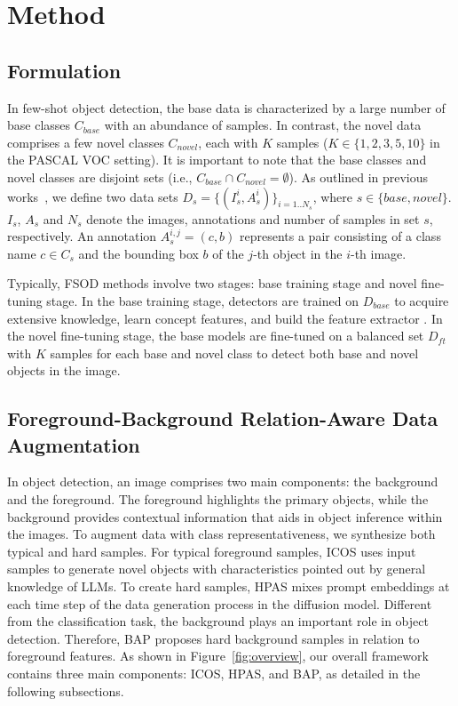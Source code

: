 \section{ Method}
\label{sec:method}

\subsection{Formulation}
In few-shot object detection, the base data is characterized by a large number of base classes $C_{base}$ with an abundance of samples. In contrast, the novel data comprises a few novel classes $C_{novel}$, each with $K$ samples ($K \in \{1, 2, 3, 5, 10\}$ in the PASCAL VOC setting). It is important to note that the base classes and novel classes are disjoint sets (i.e., $C_{base} \cap C_{novel} = \emptyset$). As outlined in previous works~\citep{meta-rcnn, TFA, defrcn}, we define two data sets $D_{s} = \{(I_{s}^i, A_{s}^i)\}_{i=1..N_{s}}$, where $s \in \{base, novel\}$. $I_s$, $A_s$ and $N_{s}$ denote the images, annotations and number of samples in set $s$, respectively. An annotation $A_{s}^{i,j} = (c, b)$ represents a pair consisting of a class name $c \in C_s$ and the bounding box $b$ of the $j$-th object in the $i$-th image.

Typically, FSOD methods involve two stages: base training stage and novel fine-tuning stage. In the base training stage, detectors are trained on $D_{base}$ to acquire extensive knowledge, learn concept features, and build the feature extractor . In the novel fine-tuning stage, the base models are fine-tuned on a balanced set $D_{ft}$ with $K$ samples for each base and novel class to detect both base and novel objects in the image.

\subsection{Foreground-Background Relation-Aware Data Augmentation}
In object detection, an image comprises two main components: the background and the foreground. The foreground highlights the primary objects, while the background provides contextual information that aids in object inference within the images. To augment data with class representativeness, we synthesize both typical and hard samples. For typical foreground samples, ICOS uses input samples to generate novel objects with characteristics pointed out by general knowledge of LLMs. To create hard samples, HPAS mixes prompt embeddings at each time step of the data generation process in the diffusion model. Different from the classification task, the background plays an important role in object detection. Therefore, BAP proposes hard background samples in relation to foreground features. As shown in Figure~\ref{fig:overview}, our overall framework contains three main components: ICOS, HPAS, and BAP, as detailed in the following subsections.  



